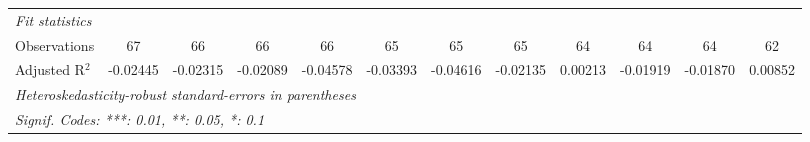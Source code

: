 \begin{tabular}{lccccccccccc}
   \midrule
   \emph{Fit statistics}\\
   Observations      & 67                    & 66       & 66       & 66                     & 65                    & 65                     & 65                     & 64       & 64       & 64            & 62\\  
   Adjusted R$^2$    & -0.02445              & -0.02315 & -0.02089 & -0.04578               & -0.03393              & -0.04616               & -0.02135               & 0.00213  & -0.01919 & -0.01870      & 0.00852\\  
   \midrule \midrule
   \multicolumn{12}{l}{\emph{Heteroskedasticity-robust standard-errors in parentheses}}\\
   \multicolumn{12}{l}{\emph{Signif. Codes: ***: 0.01, **: 0.05, *: 0.1}}\\
\end{tabular}
\par\endgroup



